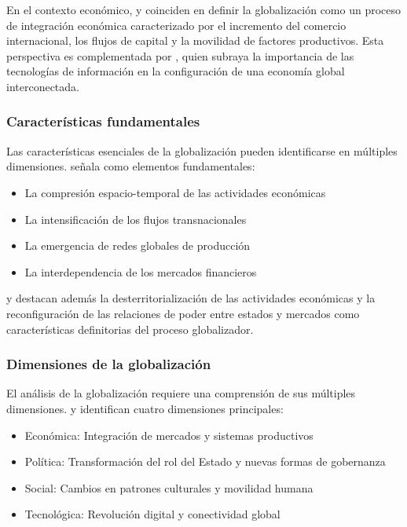 \documentclass[12pt, a4paper]{article}
\begin{document}
En el contexto económico, \cite{krugman2018} y \cite{sassen2007} coinciden en definir la globalización como un proceso de integración económica caracterizado por el incremento del comercio internacional, los flujos de capital y la movilidad de factores productivos. Esta perspectiva es complementada por \cite{castells2010}, quien subraya la importancia de las tecnologías de información en la configuración de una economía global interconectada.

\subsubsection{Características fundamentales}
Las características esenciales de la globalización pueden identificarse en múltiples dimensiones. \cite{dicken2015} señala como elementos fundamentales:
\begin{itemize}
    \item La compresión espacio-temporal de las actividades económicas
    \item La intensificación de los flujos transnacionales
    \item La emergencia de redes globales de producción
    \item La interdependencia de los mercados financieros
\end{itemize}

\cite{scholte2005} y \cite{harvey2009} destacan además la desterritorialización de las actividades económicas y la reconfiguración de las relaciones de poder entre estados y mercados como características definitorias del proceso globalizador.

\subsubsection{Dimensiones de la globalización}
El análisis de la globalización requiere una comprensión de sus múltiples dimensiones. \cite{keohane2018} y \cite{nye2020} identifican cuatro dimensiones principales:
\begin{itemize}
    \item Económica: Integración de mercados y sistemas productivos
    \item Política: Transformación del rol del Estado y nuevas formas de gobernanza
    \item Social: Cambios en patrones culturales y movilidad humana
    \item Tecnológica: Revolución digital y conectividad global
\end{itemize}
\end{document}
